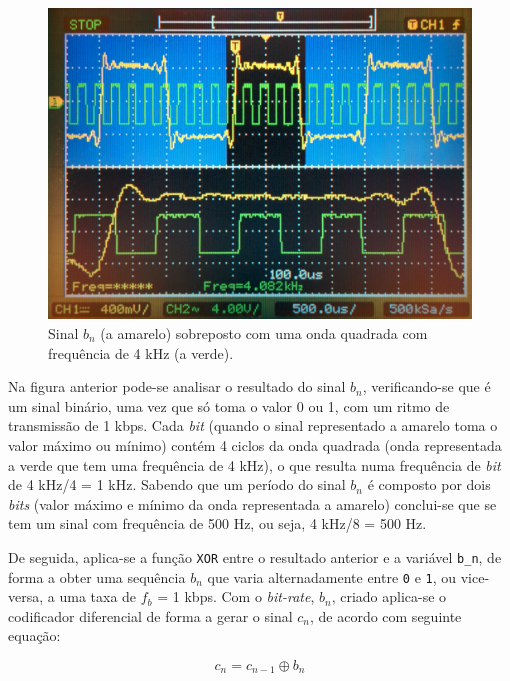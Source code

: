\documentclass[11pt]{article}
\numberwithin{equation}{section}
\begin{document}
\begin{figure}[H]
	\centering
	\includegraphics[keepaspectratio=true, scale=0.10]{exps/bn_zoom}
	\caption{Sinal $b_n$ (a amarelo) sobreposto com uma onda quadrada com frequência de 4 kHz (a verde).}
	\vspace{-0.8em}
\end{figure} 

Na figura anterior pode-se analisar o resultado do sinal $b_n$, verificando-se que é um sinal binário, uma vez que só toma o valor 0 ou 1, com um ritmo de transmissão de 1 kbps. Cada \textit{bit} (quando o sinal representado a amarelo toma o valor máximo ou mínimo) contém 4 ciclos da onda quadrada (onda representada a verde que tem uma frequência de 4 kHz), o que resulta numa frequência de \textit{bit} de 4 kHz/4 = 1 kHz. Sabendo que um período do sinal $b_n$ é composto por dois \textit{bits} (valor máximo e mínimo da onda representada a amarelo) conclui-se que se tem um sinal com frequência de 500 Hz, ou seja, 4 kHz/8 = 500 Hz.


De seguida, aplica-se a função \texttt{XOR} entre o resultado anterior e a variável \texttt{b\_n}, de forma a obter uma sequência $b_n$ que varia alternadamente entre \texttt{0} e \texttt{1}, ou vice-versa, a uma taxa de $f_b$ = 1 kbps. Com o \textit{bit-rate}, $b_n$, criado aplica-se o codificador diferencial de forma a gerar o sinal $c_n$, de acordo com seguinte equação:

\vspace{-3mm}
\begin{equation}
	c_n = c_{n-1} \oplus b_n
\end{equation} 
\end{document}
